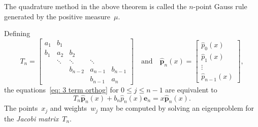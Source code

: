 \documentclass[12pt,a4paper]{article}
\newcommand{\hatvecp}{\hat{\boldsymbol{p}}}
\begin{document}
The quadrature method in the above theorem is called the $n$-point Gauss 
rule generated by the positive measure~$\mu$.

Defining
\[
T_n=\begin{bmatrix}
a_1&b_1   &       &       &\\
b_1&a_2   &b_2    &       &\\
   &\ddots&\ddots &\ddots &\\
   &      &b_{n-2}&a_{n-1}&b_{n-1}\\
   &      &       &b_{n-1}&a_n
\end{bmatrix}
\quad\text{and}\quad
\hatvecp_n(x)=\begin{bmatrix}
	\hat p_0(x)\\ \hat p_1(x)\\ \vdots\\ \hat p_{n-1}(x)
\end{bmatrix},
\]
the equations~\eqref{eq: 3 term orthog} for $0\le j\le n-1$ are 
equivalent to
\begin{equation}\label{eq: matrix 3 term orthog}
T_n\hatvecp_n(x)+b_n\hat p_n(x)\boldsymbol{e}_n=x\hatvecp_n(x).
\end{equation}
The points~$x_j$ and weights~$w_j$ may be computed by solving an 
eigenproblem for the \emph{Jacobi matrix}~$T_n$.
\end{document}
